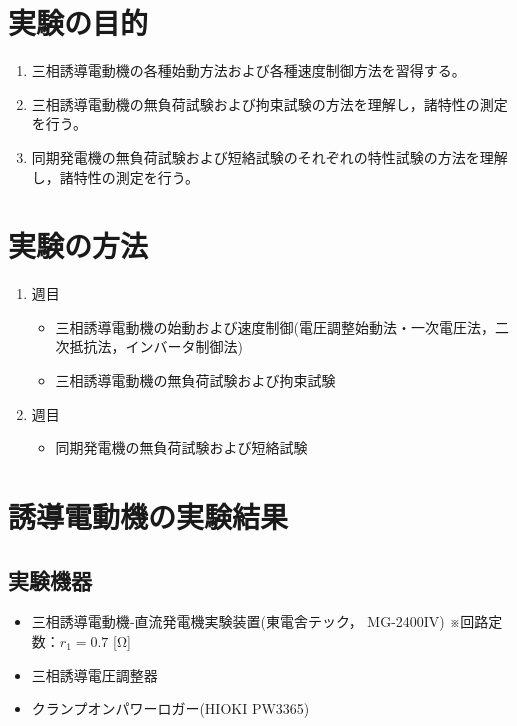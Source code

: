 \documentclass[a4paper,11pt,xelatex,ja=standard]{bxjsarticle}
\begin{document}
\section{実験の目的}
    \begin{enumerate}
        \item 三相誘導電動機の各種始動方法および各種速度制御方法を習得する。
        \item 三相誘導電動機の無負荷試験および拘束試験の方法を理解し，諸特性の測定を行う。
        \item 同期発電機の無負荷試験および短絡試験のそれぞれの特性試験の方法を理解し，諸特性の測定を行う。
    \end{enumerate}

\section{実験の方法}
    \begin{enumerate}
        \item 週目
        \begin{itemize}
            \item 三相誘導電動機の始動および速度制御(電圧調整始動法・一次電圧法，二次抵抗法，インバータ制御法)
            \item 三相誘導電動機の無負荷試験および拘束試験
        \end{itemize}
        \item 週目
        \begin{itemize}
            \item 同期発電機の無負荷試験および短絡試験
        \end{itemize}
    \end{enumerate}



\section{誘導電動機の実験結果}
    \subsection{実験機器}
        \begin{itemize}
            \item 三相誘導電動機‐直流発電機実験装置(東電舎テック， MG-2400IV) ※回路定数：\( r_1 = 0.7 \) [Ω]
            \item 三相誘導電圧調整器
            \item クランプオンパワーロガー(HIOKI PW3365)
        \end{itemize}
\end{document}
